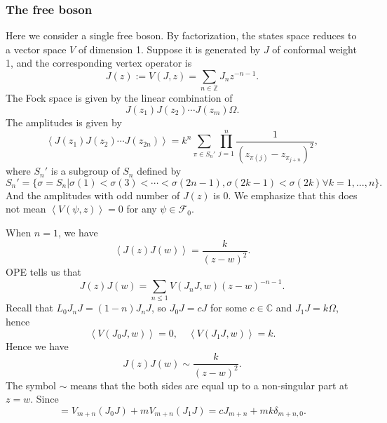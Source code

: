 \documentclass[10pt,reqno,draft]{article}
\numberwithin{equation}{section}
\numberwithin{figure}{section}
\numberwithin{table}{section}
\theoremstyle{plain}
\theoremstyle{definition}
\theoremstyle{remark}
\begin{document}
  \subsubsection{The free boson}
  Here we consider a single free boson. By factorization, the states space reduces to a vector space \(V\) of dimension 1. Suppose it is generated by \(J\) of conformal weight 1, and the corresponding vertex operator is 
  \begin{equation}
    J(z):=V(J,z)=\sum_{n\in \mathbb{Z}} J_{n}z^{-n-1}.
  \end{equation}
  The Fock space is given by the linear combination of 
  \begin{equation}
    J(z_1)J(z_2)\cdots J(z_{m})\Omega.
  \end{equation}
  The amplitudes is given by
  \begin{equation}
    \left< J(z_1)J(z_2)\cdots J(z_{2n}) \right> = k^{n}\sum_{\pi\in S_{n}'} \prod_{j=1}^{n} \frac{1}{(z_{\pi(j)}-z_{\pi_{j+n}})^{2}},
  \end{equation}
  where \(S_{n}'\) is a subgroup of \(S_{n}\) defined by
  \begin{equation}
    S_{n}'=\{\sigma=S_{n}|\sigma(1)<\sigma(3)<\cdots<\sigma(2n-1),\sigma(2k-1)<\sigma(2k)\forall k=1,\ldots,n\} .
  \end{equation}
  And the amplitudes with odd number of \(J(z)\) is 0. We emphasize that this does not mean \(\left<V(\psi,z) \right> =0\) for any \(\psi\in \mathcal{F}_{0}\).

  When \(n=1 \), we have 
  \[
  \left<J(z)J(w) \right> = \frac{k}{(z-w)^2}
  .\] 
  OPE tells us that 
  \begin{equation}
    J(z)J(w)=\sum_{n\le 1} V(J_{n}J,w)(z-w)^{-n-1}. 
  \end{equation}
  Recall that \(L_0J_{n}J=(1-n)J_{n}J\), so \(J_0J=cJ\) for some \(c\in \mathbb{C}\) and \(J_1J=k\Omega\), hence
  \[
      \left<V(J_0J,w) \right> =0, \quad\left< V(J_1J,w) \right> = k.
  \]
  Hence we have 
  \begin{equation}
    J(z)J(w)\sim \frac{k}{(z-w)^2}.
  \end{equation}
  The symbol \(\sim \) means that the both sides are equal up to a non-singular part at \(z=w\). Since 
  \begin{equation}
    [J_{m},J_{n}]=V_{m+n}(J_0J)+mV_{m+n}(J_1J)=cJ_{m+n}+mk\delta_{m+n,0}.
  \end{equation}
  
    
    
\end{document}
